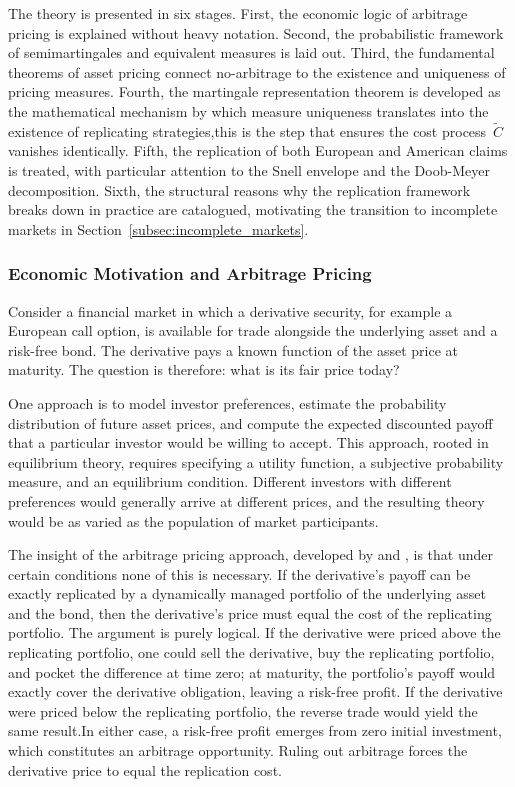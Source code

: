 The theory is presented in six stages.  First, the economic logic of
arbitrage pricing is explained without heavy notation.  Second, the
probabilistic framework of semimartingales and equivalent measures is laid
out.  Third, the fundamental theorems of asset pricing connect
no-arbitrage to the existence and uniqueness of pricing measures.  Fourth,
the martingale representation theorem is developed as the mathematical
mechanism by which measure uniqueness translates into the existence of
replicating strategies,this is the step that ensures the cost
process~$\tilde{C}$ vanishes identically.  Fifth, the replication of both
European and American claims is treated, with particular attention to the
Snell envelope and the Doob-Meyer decomposition.  Sixth, the structural
reasons why the replication framework breaks down in practice are
catalogued, motivating the transition to incomplete markets in
Section~\ref{subsec:incomplete_markets}.


\subsubsection{Economic Motivation and Arbitrage Pricing}
\label{sssec:arbitrage_pricing}

Consider a financial market in which a derivative security, for example a European call option, is available for trade alongside the underlying asset and a risk-free bond. The derivative pays a known function of the asset price at maturity. The question is therefore: what is its fair price today?


One approach is to model investor preferences, estimate the probability
distribution of future asset prices, and compute the expected discounted
payoff that a particular investor would be willing to accept.  This
approach, rooted in equilibrium theory, requires specifying a utility
function, a subjective probability measure, and an equilibrium condition.
Different investors with different preferences would generally arrive at
different prices, and the resulting theory would be as varied as the
population of market participants.

The insight of the arbitrage pricing approach, developed by
\citet{BlackScholes1973} and \citet{Merton1973}, is that under certain
conditions none of this is necessary.  If the derivative's payoff can be
exactly replicated by a dynamically managed portfolio of the underlying
asset and the bond, then the derivative's price must equal the cost of the
replicating portfolio.  The argument is purely logical.  If the derivative
were priced above the replicating portfolio, one could sell the derivative,
buy the replicating portfolio, and pocket the difference at time zero; at
maturity, the portfolio's payoff would exactly cover the derivative
obligation, leaving a risk-free profit.  If the derivative were priced
below the replicating portfolio, the reverse trade would yield the same
result.In either case, a risk-free profit emerges from zero initial investment, which constitutes an arbitrage opportunity. Ruling out arbitrage forces the derivative price to equal the replication cost.


